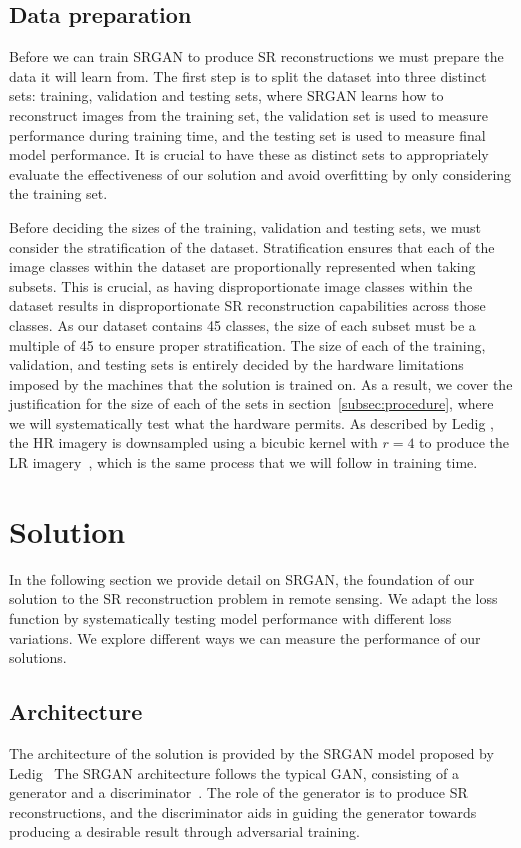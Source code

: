 \subsection{Data preparation}\label{subsec:data_preparation}
Before we can train SRGAN to produce SR reconstructions we must prepare the data it will learn from. The first step is to split the dataset into three distinct sets: training, validation and testing sets, where SRGAN learns how to reconstruct images from the training set, the validation set is used to measure performance during training time, and the testing set is used to measure final model performance. It is crucial to have these as distinct sets to appropriately evaluate the effectiveness of our solution and avoid overfitting by only considering the training set.

Before deciding the sizes of the training, validation and testing sets, we must consider the stratification of the dataset. Stratification ensures that each of the image classes within the dataset are proportionally represented when taking subsets. This is crucial, as having disproportionate image classes within the dataset results in disproportionate SR reconstruction capabilities across those classes. As our dataset contains 45 classes, the size of each subset must be a multiple of 45 to ensure proper stratification. The size of each of the training, validation, and testing sets is entirely decided by the hardware limitations imposed by the machines that the solution is trained on. As a result, we cover the justification for the size of each of the sets in section~\ref{subsec:procedure}, where we will systematically test what the hardware permits. As described by Ledig \etal, the HR imagery is downsampled using a bicubic kernel with $r = 4$ to produce the LR imagery~\cite{srgan}, which is the same process that we will follow in training time.

\section{Solution}
In the following section we provide detail on SRGAN, the foundation of our solution to the SR reconstruction problem in remote sensing. We adapt the loss function by systematically testing model performance with different loss variations. We explore different ways we can measure the performance of our solutions.

\subsection{Architecture}\label{subsec:architecture}
The architecture of the solution is provided by the SRGAN model proposed by Ledig \etal\ The SRGAN architecture follows the typical GAN, consisting of a generator and a discriminator~\cite{gan}. The role of the generator is to produce SR reconstructions, and the discriminator aids in guiding the generator towards producing a desirable result through adversarial training.

